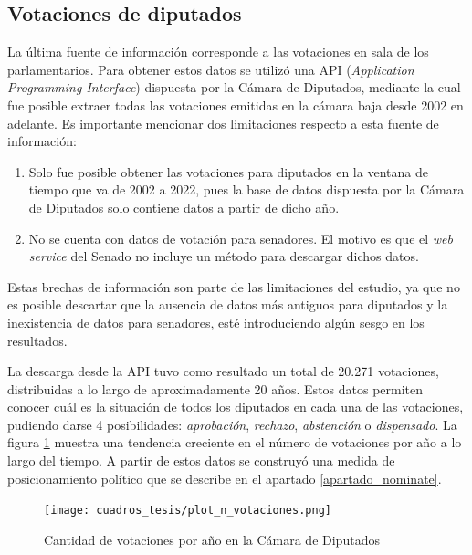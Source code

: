 \documentclass[
  12pt,
]{article}
\begin{document}
\hypertarget{votaciones-de-diputados}{%
\subsection{Votaciones de diputados}\label{votaciones-de-diputados}}

La última fuente de información corresponde a las votaciones en sala de
los parlamentarios. Para obtener estos datos se utilizó una API
(\emph{Application Programming Interface}) dispuesta por la Cámara de
Diputados, mediante la cual fue posible extraer todas las votaciones
emitidas en la cámara baja desde 2002 en adelante. Es importante
mencionar dos limitaciones respecto a esta fuente de información:

\begin{enumerate}
\def\labelenumi{\arabic{enumi}.}
\item
  Solo fue posible obtener las votaciones para diputados en la ventana
  de tiempo que va de 2002 a 2022, pues la base de datos dispuesta por
  la Cámara de Diputados solo contiene datos a partir de dicho año.
\item
  No se cuenta con datos de votación para senadores. El motivo es que el
  \emph{web service} del Senado no incluye un método para descargar
  dichos datos.
\end{enumerate}

Estas brechas de información son parte de las limitaciones del estudio,
ya que no es posible descartar que la ausencia de datos más antiguos
para diputados y la inexistencia de datos para senadores, esté
introduciendo algún sesgo en los resultados.

La descarga desde la API tuvo como resultado un total de 20.271
votaciones, distribuidas a lo largo de aproximadamente 20 años. Estos
datos permiten conocer cuál es la situación de todos los diputados en
cada una de las votaciones, pudiendo darse 4 posibilidades:
\emph{aprobación}, \emph{rechazo}, \emph{abstención} o
\emph{dispensado}. La figura \ref{plot_n_votaciones} muestra una
tendencia creciente en el número de votaciones por año a lo largo del
tiempo. A partir de estos datos se construyó una medida de
posicionamiento político que se describe en el apartado
\ref{apartado_nominate}.

\begin{figure}[H]
\centering
\large
\caption{Cantidad de votaciones por año en la Cámara de Diputados}
\label{plot_n_votaciones}
\texttt{[image: cuadros\_tesis/plot\_n\_votaciones.png]}
\normalsize
\end{figure}
\end{document}
